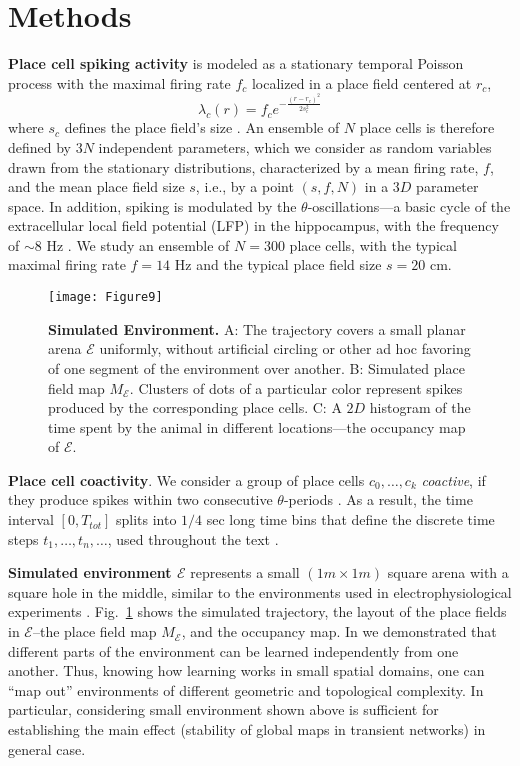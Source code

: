 \documentclass[12pt,tightenlines]{revtex4}
\begin{document}
\section{Methods}
\label{section:methods}

\textbf{Place cell spiking activity} is modeled as a stationary temporal Poisson process with the maximal firing 
rate $f_c$ localized in a place field centered at $r_c$,
\begin{equation}
\lambda_c(r)=f_c e^{-\frac{(r-r_c)^2}{2s^2_c}}
\nonumber
\end{equation}
where $s_c$ defines the place field's size \cite{Barbieri}. An ensemble of $N$ place cells is therefore defined 
by $3N$ independent parameters, which we consider as random variables drawn from the stationary distributions, 
characterized by a mean firing rate, $f$, and the mean place field size $s$, i.e., by a point $(s, f, N)$ in a $3D$ 
parameter space. In addition, spiking is modulated by the $\theta$-oscillations---a basic cycle of the extracellular 
local field potential (LFP) in the hippocampus, with the frequency of $\sim 8$ Hz \cite{Buzsaki2}.
We study an ensemble of $N = 300$ place cells, with the typical maximal firing rate $f = 14$ Hz and the typical 
place field size $s = 20$ cm. 

\begin{figure}[!h]
\texttt{[image: Figure9]}
\caption{{\footnotesize\textbf{Simulated Environment.} A: The trajectory covers a small planar arena $\mathcal{E}$ uniformly, 
without artificial circling or other ad hoc favoring of one segment of the environment over another. B: Simulated 
place field map $M_\mathcal{E}$. Clusters of dots of a particular color represent spikes produced by the corresponding 
place cells. C: A $2D$ histogram of the time spent by the animal in different locations---the occupancy map of $\mathcal{E}$.}}
\label{Figure9}
\end{figure}

\textbf{Place cell coactivity}. We consider a group of place cells $c_0, \ldots, c_k$ \emph{coactive}, if they produce 
spikes within two consecutive $\theta$-periods \cite{Arai,Mizuseki}. As a result, the time interval $[0, T_{tot}]$ splits 
into $1/4$ sec long time bins that define the discrete time steps $t_1,\ldots, t_n, \ldots$, used throughout the text 
\cite{Babichev1}.

\textbf{Simulated environment $\mathcal{E}$} represents a small $(1m \times 1m)$ square arena with a square 
hole in the middle, similar to the environments used in electrophysiological experiments \cite{Fu}. Fig.~\ref{Figure9}
shows the simulated trajectory, the layout of the place fields in $\mathcal{E}$--the place field map $M_\mathcal{E}$,
and the occupancy map. In \cite{Arai} we demonstrated that different parts of the environment can be learned independently 
from one another. Thus, knowing how learning works in small spatial domains, one can ``map out'' environments of 
different geometric and topological complexity. In particular, considering small environment shown above is sufficient 
for establishing the main effect (stability of global maps in transient networks) in general case.
\end{document}
